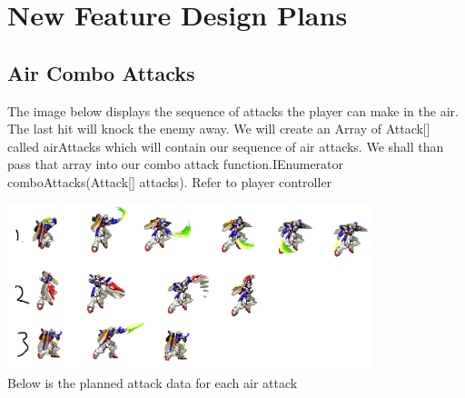 \documentclass{article}
\begin{document}
\section*{New Feature Design Plans}
\subsection{Air Combo Attacks}
The image below displays the sequence of attacks the player can make in the air. The last hit will knock the enemy away. We will create an Array of Attack[] called airAttacks which will contain our sequence of air attacks. We shall than pass that array into our combo attack function.IEnumerator comboAttacks(Attack[] attacks). Refer to player controller


       \includegraphics[width=0.8\textwidth]{airCombo.png} \\
        Below  is the planned attack data for each air attack \\
        
\end{document}
